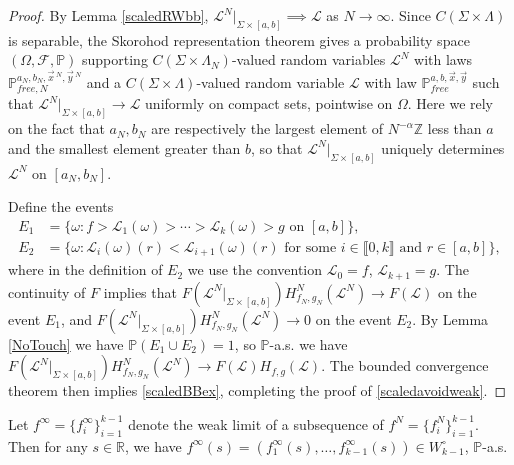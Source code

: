 \begin{proof}
	By Lemma \ref{scaledRWbb}, $\mathcal{L}^N|_{\Sigma\times[a,b]} \implies \mathcal{L}$ as $N\to\infty$. Since $C(\Sigma\times\Lambda)$ is separable, the Skorohod representation theorem \cite[Theorem 6.7]{Billing} gives a probability space $(\Omega,\mathcal{F},\mathbb{P})$ supporting $C(\Sigma\times\Lambda_N)$-valued random variables $\mathcal{L}^N$ with laws $\mathbb{P}^{a_N,b_N,\vec{x}\,^N,\vec{y}\,^N}_{free,N}$ and a $C(\Sigma\times\Lambda)$-valued random variable $\mathcal{L}$ with law $\mathbb{P}^{a,b,\vec{x},\vec{y}}_{free}$ such that $\mathcal{L}^N|_{\Sigma\times[a,b]}\to\mathcal{L}$ uniformly on compact sets, pointwise on $\Omega$. Here we rely on the fact that $a_N,b_N$ are respectively the largest element of $N^{-\alpha}\mathbb{Z}$ less than $a$ and the smallest element greater than $b$, so that $\mathcal{L}^N|_{\Sigma\times[a,b]}$ uniquely determines $\mathcal{L}^N$ on $[a_N,b_N]$.
	
	Define the events
	\begin{align*}
	E_1 &= \{\omega : f > \mathcal{L}_1(\omega) > \cdots > \mathcal{L}_k(\omega) > g \mbox{ on } [a,b]\},\\
	E_2 &= \{\omega : \mathcal{L}_i(\omega)(r) < \mathcal{L}_{i+1}(\omega)(r) \mbox{ for some } i\in\llbracket 0,k\rrbracket \mbox{ and } r\in[a,b]\},
	\end{align*}
	where in the definition of $E_2$ we use the convention $\mathcal{L}_0 = f$, $\mathcal{L}_{k+1} = g$. The continuity of $F$ implies that $F(\mathcal{L}^N|_{\Sigma\times[a,b]})H^N_{f_N,g_N}(\mathcal{L}^N) \to F(\mathcal{L})$ on the event $E_1$, and $F(\mathcal{L}^N|_{\Sigma\times[a,b]})H^N_{f_N,g_N}(\mathcal{L}^N)\to 0$ on the event $E_2$. By Lemma \ref{NoTouch} we have $\mathbb{P}(E_1 \cup E_2) = 1$, so $\mathbb{P}$-a.s. we have $F(\mathcal{L}^N|_{\Sigma\times[a,b]})H^N_{f_N,g_N}(\mathcal{L}^N) \to F(\mathcal{L})H_{f,g}(\mathcal{L})$. The bounded convergence theorem then implies \eqref{scaledBBex}, completing the proof of \eqref{scaledavoidweak}.
\end{proof}

\begin{lemma}\label{inftydistinct}
	Let $f^\infty = \{f^\infty_i\}_{i=1}^{k-1}$ denote the weak limit of a subsequence of $f^N = \{f^N_i\}_{i=1}^{k-1}$. Then for any $s\in\mathbb{R}$, we have $f^\infty(s) = (f_1^\infty(s),\dots,f_{k-1}^\infty(s)) \in W^\circ_{k-1}$, $\mathbb{P}$-a.s.
\end{lemma}

